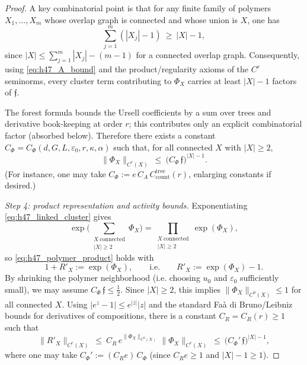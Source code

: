 \begin{proof}
A key combinatorial point is that for any finite family of polymers $X_1,\dots,X_m$ whose overlap graph is connected and whose union is $X$,
one has
\begin{equation}\label{eq:h47_union_ineq}
\sum_{j=1}^m (|X_j|-1)\ \ge\ |X|-1,
\end{equation}
since $|X|\le \sum_{j=1}^m |X_j|-(m-1)$ for a connected overlap graph.
Consequently, using \eqref{eq:h47_A_bound} and the product/regularity axioms of the $C^r$ seminorms, every cluster term contributing to $\Phi_X$
carries at least $|X|-1$ factors of $\mathfrak f$.

The forest formula bounds the Ursell coefficients by a sum over trees and derivative book-keeping at order $r$; this contributes only an explicit
combinatorial factor (absorbed below).
Therefore there exists a constant $C_\Phi=C_\Phi(d,G,L,\varepsilon_0,r,\kappa,\alpha)$ such that, for all connected $X$ with $|X|\ge 2$,
\begin{equation}\label{eq:h47_Phi_bound}
\|\Phi_X\|_{C^r(X)}\ \le\ \bigl(C_\Phi\,\mathfrak f\bigr)^{|X|-1}.
\end{equation}
(For instance, one may take $C_\Phi := e\,C_A\,C_{\mathrm{count}}^{\mathrm{tree}}(r)$, enlarging constants if desired.)

\emph{Step 4: product representation and activity bounds.}
Exponentiating \eqref{eq:h47_linked_cluster} gives
\[
\exp\Big(\sum_{\substack{X\ \mathrm{connected}\\ |X|\ge 2}} \Phi_X\Big)
=\prod_{\substack{X\ \mathrm{connected}\\ |X|\ge 2}} \exp(\Phi_X),
\]
so \eqref{eq:h47_polymer_product} holds with
\begin{equation}\label{eq:h47_Rprime_def}
1+R'_X := \exp(\Phi_X),
\qquad\text{i.e.}\qquad
R'_X := \exp(\Phi_X)-1.
\end{equation}
By shrinking the polymer neighborhood (i.e. choosing $u_0$ and $\varepsilon_0$ sufficiently small),
we may assume $C_\Phi\,\mathfrak f\le \tfrac12$. Since $|X|\ge 2$, this implies $\|\Phi_X\|_{C^0(X)}\le 1$ for all connected $X$.
Using $|e^z-1|\le e^{|z|}|z|$ and the standard Fa\`a di Bruno/Leibniz bounds for derivatives of compositions, there is a constant $C_R=C_R(r)\ge 1$
such that
\begin{equation}\label{eq:h47_Rprime_bound}
\|R'_X\|_{C^r(X)}
\ \le\ C_R\,e^{\|\Phi_X\|_{C^0(X)}}\,\|\Phi_X\|_{C^r(X)}
\ \le\ \bigl(C_{\Phi}'\,\mathfrak f\bigr)^{|X|-1},
\end{equation}
where one may take $C_{\Phi}':= (C_R e)\,C_\Phi$ (since $C_R e\ge 1$ and $|X|-1\ge 1$).


\end{proof}
